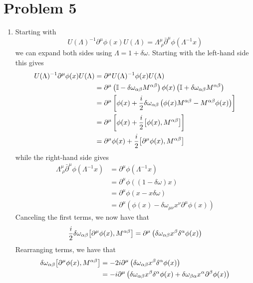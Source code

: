 \documentclass[12pt]{article}
\begin{document}
\section*{Problem 5}
\begin{enumerate}[label=(\alph*)]
    \item Starting with
    \[ U(\Lambda)^{-1}\partial^\mu\phi(x)U(\Lambda) = \Lambda_{\;\rho}^\mu\bar{\partial}^\mu\phi(\Lambda^{-1}x) \]
    we can expand both sides using $\Lambda = 1 + \delta\omega$. Starting with the left-hand side this gives
    \begin{align*}
        U(\Lambda)^{-1}\partial^\mu\phi(x)U(\Lambda) &= \partial^\mu U(\Lambda)^{-1}\phi(x)U(\Lambda) \\
        &= \partial^\mu \left(\mathbb{I} - \delta\omega_{\alpha\beta}M^{\alpha\beta}\right)\phi(x)\left(\mathbb{I} + \delta\omega_{\alpha\beta}M^{\alpha\beta}\right) \\
        &= \partial^\mu \left[\phi(x) + \frac{i}{2}\delta\omega_{\alpha\beta}\left(\phi(x)M^{\alpha\beta} - M^{\alpha\beta}\phi(x)\right)\right] \\
        &= \partial^\mu \left[\phi(x) + \frac{i}{2}\comm{\phi(x)}{M^{\alpha\beta}}\right] \\
        &= \partial^\mu \phi(x) + \frac{i}{2}\comm{\partial^\mu\phi(x)}{M^{\alpha\beta}}
    \end{align*}
    while the right-hand side gives
    \begin{align*}
        \Lambda_{\;\rho}^\mu\bar{\partial}^\mu\phi(\Lambda^{-1}x) &= \partial^\mu \phi(\Lambda^{-1}x) \\
        &= \partial^\mu\phi((1-\delta\omega)x) \\
        &= \partial^\mu\phi(x - x\delta\omega) \\
        &= \partial^\mu\left(\phi(x) - \delta\omega_{\mu\nu}x^\nu\partial^\mu\phi(x)\right) 
    \end{align*}
    Canceling the first terms, we now have that
    \[ \frac{i}{2}\delta\omega_{\alpha\beta}\comm{\partial^\mu\phi(x)}{M^{\alpha\beta}} = \partial^\mu\left(\delta\omega_{\alpha\beta}x^\beta\delta^\alpha\phi(x)\right) \]
    Rearranging terms, we have that
    \begin{align*}
        \delta\omega_{\alpha\beta}\comm{\partial^\mu\phi(x)}{M^{\alpha\beta}} &= -2i\partial^\mu\left(\delta\omega_{\alpha\beta}x^\beta\delta^\alpha\phi(x)\right) \\
        &= -i\partial^\mu\left(\delta\omega_{\alpha\beta}x^\beta\delta^\alpha\phi(x) + \delta\omega_{\beta\alpha}x^\alpha\partial^\beta\phi(x)\right) \\

\end{align*}
\end{enumerate}
\end{document}
